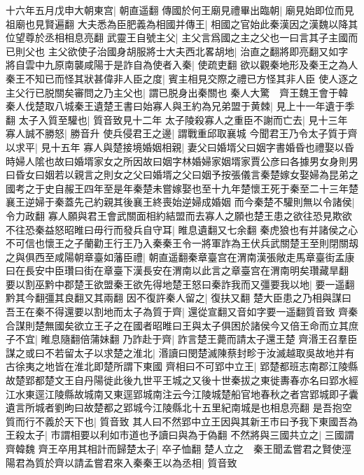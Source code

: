 十六年五月戊申大朝東宫|{
	朝直遥翻
	}
傳國於何王廟見禮畢出臨朝|{
	廟見始即位而見祖廟也見賢遍翻
	}
大夫悉為臣肥義為相國并傳王|{
	相國之官始此秦漢因之漢魏以降其位望尊於丞相相息亮翻
	}
武靈王自號主父|{
	主父言爲國之主之父也一曰言其子主國而已則父也
	}
主父欲使子治國身胡服將士大夫西北畧胡地|{
	治直之翻將即亮翻又如字
	}
將自雲中九原南襲咸陽于是詐自為使者入秦|{
	使疏吏翻
	}
欲以觀秦地形及秦王之為人秦王不知已而怪其狀甚偉非人臣之度|{
	賓主相見交際之禮已方怪其非人臣
	}
使人逐之主父行已脱關矣審問之乃主父也|{
	謂已脱身出秦關也
	}
秦人大驚　齊王魏王會于韓　秦人伐楚取八城秦王遺楚王書曰始寡人與王約為兄弟盟于黄棘|{
	見上十一年遺于季翻
	}
太子入質至驩也|{
	質音致見十二年
	}
太子陵殺寡人之重臣不謝而亡去|{
	見十三年
	}
寡人誠不勝怒|{
	勝音升
	}
使兵侵君王之邊|{
	謂戰重邱取襄城
	}
今聞君王乃令太子質于齊以求平|{
	見十五年
	}
寡人與楚接境婚姻相親|{
	妻父曰婚壻父曰姻字書婚昏也禮娶以昏時婦人隂也故曰婚壻家女之所因故曰姻字林婚婦家姻壻家賈公彦曰各據男女身則男曰昏女曰姻若以親言之則女之父曰婚壻之父曰姻予按張儀言秦楚嫁女娶婦為昆弟之國考之于史自赧王四年至是年秦楚未嘗嫁娶也至十九年楚懷王死于秦至二十三年楚襄王逆婦于秦蓋先己約親其後襄王終喪始逆婦成婚姻
	}
而今秦楚不驩則無以令諸侯|{
	令力政翻
	}
寡人願與君王會武關面相約結盟而去寡人之願也楚王患之欲往恐見欺欲不往恐秦益怒昭睢曰毋行而發兵自守耳|{
	睢息遺翻又七余翻
	}
秦虎狼也有并諸侯之心不可信也懷王之子蘭勸王行王乃入秦秦王令一將軍詐為王伏兵武關楚王至則閉關刼之與俱西至咸陽朝章臺如藩臣禮|{
	朝直遥翻秦章臺宫在渭南漢張敞走馬章臺街孟康曰在長安中臣瓚曰街在章臺下漢長安在渭南以此言之章臺宫在渭南明矣瓚藏旱翻
	}
要以割巫黔中郡楚王欲盟秦王欲先得地楚王怒曰秦詐我而又彊要我以地|{
	要一遥翻黔其今翻彊其良翻又其兩翻
	}
因不復許秦人留之|{
	復扶又翻
	}
楚大臣患之乃相與謀曰吾王在秦不得還要以割地而太子為質于齊|{
	還從宣翻又音如字要一遥翻質音致
	}
齊秦合謀則楚無國矣欲立王子之在國者昭睢曰王與太子俱困於諸侯今又倍王命而立其庶子不宜|{
	睢息隨翻倍蒲妹翻
	}
乃詐赴于齊|{
	詐言楚王薨而請太子還王楚
	}
齊湣王召羣臣謀之或曰不若留太子以求楚之淮北|{
	湣讀曰閔楚滅陳蔡封畛于汝滅越取吳故地并有古徐夷之地皆在淮北即楚所謂下東國
	}
齊相曰不可郢中立王|{
	郢楚都班志南郡江陵縣故楚郢都楚文王自丹陽徙此後九世平王城之又後十世秦拔之東徙夀春亦名曰郢水經江水東逕江陵縣故城南又東逕郢城南注云今江陵城楚船官地春秋之者宫郢城即子囊遺言所城者劉昫曰故楚都之郢城今江陵縣北十五里紀南城是也相息亮翻
	}
是吾抱空質而行不義於天下也|{
	質音致
	}
其人曰不然郢中立王因與其新王市曰予我下東國吾為王殺太子|{
	市謂相要以利如市道也予讀曰與為于偽翻
	}
不然將與三國共立之|{
	三國謂齊韓魏
	}
齊王卒用其相計而歸楚太子|{
	卒子恤翻
	}
楚人立之　秦王聞孟嘗君之賢使涇陽君為質於齊以請孟嘗君來入秦秦王以為丞相|{
	質音致
	}


